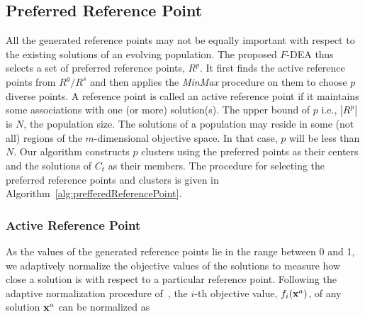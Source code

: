 \documentclass[review]{elsarticle}
\begin{document}



\subsection{Preferred Reference Point}
\label{subsec:prefereableReferencePoint}

All the generated reference points may not be equally important with respect to the existing solutions of an evolving population. 
The proposed $F$-DEA thus selects a set of preferred reference points, $R^p$. It first finds the 
active reference points from $R^g/R^s$ and then applies the {\it MinMax} procedure on them  
to choose $p$ diverse points. A reference point is called an active reference point if it maintains 
some associations with one (or more) solution(s). The upper bound of $p$ i.e., $|R^p|$
is $N$, the population size. The solutions of a population may reside in some (not all) regions of the 
$m$-dimensional objective 
space. In that case, $p$ will be less than $N$. Our algorithm
constructs $p$ clusters using the preferred points as their centers and the solutions of $C_t$ as their members. 
The procedure for selecting the preferred reference points and clusters is given in Algorithm~\ref{alg:prefferedReferencePoint}.

\subsubsection{Active Reference Point}
\label{subsubsec: activeReferencePoint}


As the values of the generated reference points lie in the range between 0 and 1, we adaptively 
normalize the objective values of the solutions to measure how close a solution is with respect to a particular reference point.
Following the adaptive normalization procedure of~\citep{deb2014evolutionary}, the $i$-th objective value, $f_i({\bf x}^a)$, of any solution ${\bf x}^a$ can be normalized as
\end{document}
